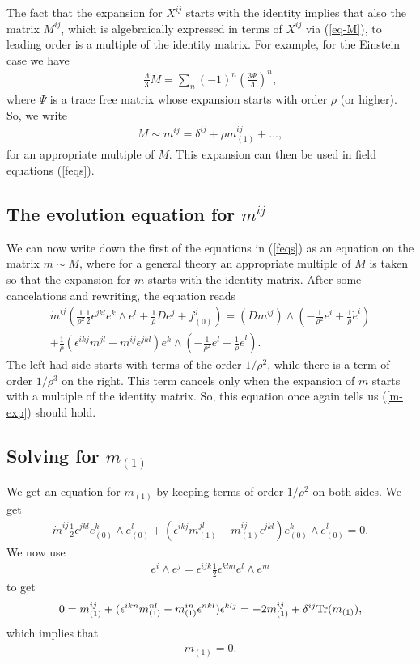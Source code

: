 \documentclass[a4paper,12pt]{article}
\newcommand{\be}{\begin{eqnarray}}
\newcommand{\ee}{\end{eqnarray}}
\begin{document}
The fact that the expansion for $X^{ij}$ starts with the identity implies that also the matrix $M^{ij}$, which is algebraically expressed in terms of $X^{ij}$ via (\ref{eq-M}), to leading order is a multiple of the identity matrix. For example, for the Einstein case we have
\be
\frac{\Lambda}{3} M = \sum_n (-1)^n \left( \frac{3\Psi}{\Lambda}\right)^n,
\ee
where $\Psi$ is a trace free matrix whose expansion starts with order $\rho$ (or higher). So, we write
\be\label{m-exp}
M \sim m^{ij} = \delta^{ij} + \rho m^{ij}_{(1)} + \ldots,
\ee
 for an appropriate multiple of $M$. This expansion can then be used in field equations (\ref{feqs}). 

\subsection{The evolution equation for $m^{ij}$}

We can now write down the first of the equations in (\ref{feqs}) as an equation on the matrix $m\sim M$, where for a general theory an appropriate multiple of $M$ is taken so that the expansion for $m$ starts with the identity matrix. After some cancelations and rewriting, the equation reads
\be\label{m-eqn}
\dot{m}^{ij} \left( \frac{1}{\rho^2}\frac{1}{2}\epsilon^{jkl}e^k\wedge e^l+\frac{1}{\rho}D e^j+f^j_{(0)}\right) = 
(Dm^{ij})\wedge \left( -\frac{1}{\rho^2} e^i + \frac{1}{\rho} \dot{e}^i\right) \\ \nonumber
+ \frac{1}{\rho} (\epsilon^{ikj} m^{jl} - m^{ij} \epsilon^{jkl}) e^k  \wedge \left( -\frac{1}{\rho^2} e^l + \frac{1}{\rho} \dot{e}^l\right).
\ee
The left-had-side starts with terms of the order $1/\rho^2$, while there is a term of order $1/\rho^3$ on the right. This term cancels only when the expansion of $m$ starts with a multiple of the identity matrix. So, this equation once again tells us (\ref{m-exp}) should hold. 

\subsection{Solving for $m_{(1)}$}

We get an equation for $m_{(1)}$ by keeping terms of order $1/\rho^2$ on both sides. We get
\be
\dot{m}^{ij} \frac{1}{2}\epsilon^{jkl}e^k_{(0)}\wedge e^l_{(0)} + (\epsilon^{ikj} m^{jl}_{(1)} - m^{ij}_{(1)} \epsilon^{jkl}) e^k_{(0)}  \wedge e^l_{(0)} =0.
\ee
We now use
\be
e^i\wedge e^j = \epsilon^{ijk} \frac{1}{2} \epsilon^{klm} e^l\wedge e^m
\ee
to get
\be
0=m^{ij}_{(1)} + (\epsilon^{ikn} m^{nl}_{(1)} - m^{in}_{(1)} \epsilon^{nkl})\epsilon^{klj}= - 2m^{ij}_{(1)} + \delta^{ij} {\rm Tr}(m_{(1)}),
\ee
which implies that
\be
m_{(1)}=0.
\ee
\end{document}
